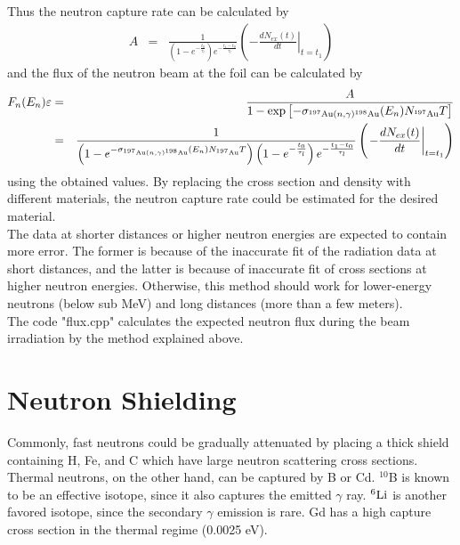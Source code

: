 \documentclass{article}
\begin{document}
Thus the neutron capture rate can be calculated by
\begin{eqnarray*}
A & = & \frac{1}{\left( 1-e^{-\frac{t_0}{\tau_l}} \right) e^{-\frac{t_1-t_0}{\tau_l}}} \left( \left. -\frac{dN_{ex}(t)}{dt}\right|_{t=t_1} \right)
\end{eqnarray*}
and the flux of the neutron beam at the foil can be calculated by
\begin{eqnarray*}
F_n (E_n) \varepsilon & = & \frac{A}{1 - \exp{\left[ -\sigma_{^{197}{\rm Au}(n,\gamma)^{198}{\rm Au}}(E_n)N_{^{197}{\rm Au}}T \right]} } \\
& = & \frac{1}{\left( 1-e^{-\sigma_{^{197}{\rm Au}(n,\gamma)^{198}{\rm Au}}(E_n)N_{^{197}{\rm Au}}T} \right) \left( 1-e^{-\frac{t_0}{\tau_l}} \right) e^{-\frac{t_1-t_0}{\tau_l}} } \left( \left. -\frac{dN_{ex}(t)}{dt}\right|_{t=t_1} \right)
\end{eqnarray*}
using the obtained values. By replacing the cross section and density with different materials, the neutron capture rate could be estimated for the desired material. \\

The data at shorter distances or higher neutron energies are expected to contain more error. The former is because of the inaccurate fit of the radiation data at short distances, and the latter is because of inaccurate fit of cross sections at higher neutron energies. Otherwise, this method should work for lower-energy neutrons (below sub MeV) and long distances (more than a few meters). \\

The code "flux.cpp" calculates the expected neutron flux during the beam irradiation by the method explained above. \\


\section{Neutron Shielding}

Commonly, fast neutrons could be gradually attenuated by placing a thick shield containing H, Fe, and C which have large neutron scattering cross sections. Thermal neutrons, on the other hand, can be captured by B or Cd. $^{10}$B is known to be an effective isotope, since it also captures the emitted $\gamma$ ray. ${}^{6}{\rm Li}$ is another favored isotope, since the secondary $\gamma$ emission is rare. Gd has a high capture cross section in the thermal regime (0.0025 eV).
\end{document}
